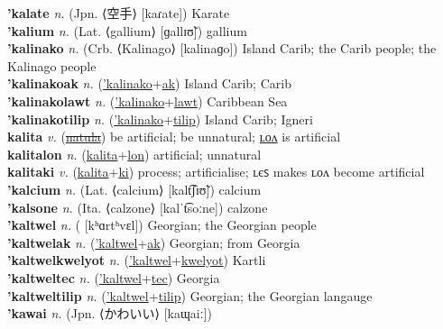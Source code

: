 \textbf{'kalate} \textit{n.} (Jpn. ⟨空手⟩ [kaɾate])
Karate \label{'kalate} \\
\textbf{'kalium} \textit{n.} (Lat. ⟨gallium⟩ [ɡallɪʊ̃])
gallium \label{'kalium} \\
\textbf{'kalinako} \textit{n.} (Crb. ⟨Kalinago⟩ [kalinaɡo])
Island Carib; the Carib people; the Kalinago people \label{'kalinako} \\
\textbf{'kalinakoak} \textit{n.} (\hyperref['kalinako]{'kalinako}+\hyperref[ak]{ak})
Island Carib; Carib \label{'kalinakoak} \\
\textbf{'kalinakolawt} \textit{n.} (\hyperref['kalinako]{'kalinako}+\hyperref[lawt]{lawt})
Caribbean Sea \label{'kalinakolawt} \\
\textbf{'kalinakotilip} \textit{n.} (\hyperref['kalinako]{'kalinako}+\hyperref[tilip]{tilip})
Island Carib; Igneri \label{'kalinakotilip} \\
\textbf{kalita} \textit{v.} (\hyperref[natula]{\sout{natula}})
be artificial; be unnatural; \hyperref[kalitalon]{ʟᴏᴧ} is artificial \label{kalita} \\
\textbf{kalitalon} \textit{n.} (\hyperref[kalita]{kalita}+\hyperref[lon]{lon})
artificial; unnatural \label{kalitalon} \\
\textbf{kalitaki} \textit{v.} (\hyperref[kalita]{kalita}+\hyperref[ki]{ki})
process; artificialise; ʟєꜱ makes ʟᴏᴧ become artificial \label{kalitaki} \\
\textbf{'kalcium} \textit{n.} (Lat. ⟨calcium⟩ [kalt͡ʃɪʊ̃])
calcium \label{'kalcium} \\
\textbf{'kalsone} \textit{n.} (Ita. ⟨calzone⟩ [kalˈt͡soːne])
calzone \label{'kalsone} \\
\textbf{'kaltwel} \textit{n.} ( [kʰɑrtʰvɛl])
Georgian; the Georgian people \label{'kaltwel} \\
\textbf{'kaltwelak} \textit{n.} (\hyperref['kaltwel]{'kaltwel}+\hyperref[ak]{ak})
Georgian; from Georgia \label{'kaltwelak} \\
\textbf{'kaltwelkwelyot} \textit{n.} (\hyperref['kaltwel]{'kaltwel}+\hyperref[kwelyot]{kwelyot})
Kartli \label{'kaltwelkwelyot} \\
\textbf{'kaltweltec} \textit{n.} (\hyperref['kaltwel]{'kaltwel}+\hyperref[tec]{tec})
Georgia \label{'kaltweltec} \\
\textbf{'kaltweltilip} \textit{n.} (\hyperref['kaltwel]{'kaltwel}+\hyperref[tilip]{tilip})
Georgian; the Georgian langauge \label{'kaltweltilip} \\
\textbf{'kawai} \textit{n.} (Jpn. ⟨かわいい⟩ [kaɰaiː])
